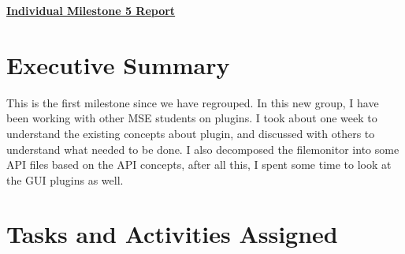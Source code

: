 \documentclass{article}
\begin{document}
\pagestyle{headings}

\begin{center}
{\LARGE\textbf{\underline{{Individual Milestone 5 Report}}}}
\end{center}

\section*{Executive Summary}

This is the first milestone since we have regrouped. In this new group, I have been working with other MSE students on plugins. I took about one week to understand the existing concepts about plugin, and discussed with others to understand what needed to be done. I also decomposed the filemonitor into some API files based on the API concepts, after all this, I spent some time to look at the GUI plugins as well.

\section*{Tasks and Activities Assigned}
\end{document}
